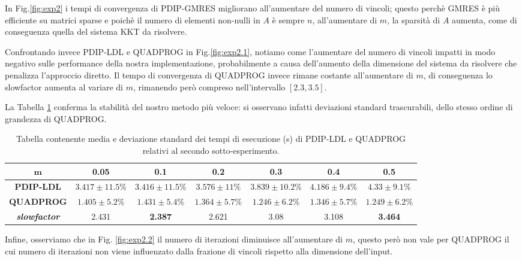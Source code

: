 In Fig.\ref{fig:exp2} i tempi di convergenza di PDIP-GMRES migliorano all'aumentare del numero di vincoli; questo perchè GMRES è più efficiente su matrici sparse e poichè il numero di elementi non-nulli in $A$ è sempre $n$, all'aumentare di $m$, la sparsità di $A$ aumenta, come di conseguenza quella del sistema KKT da risolvere.

Confrontando invece PDIP-LDL e QUADPROG in Fig.\ref{fig:exp2.1}, notiamo come l'aumentare del numero di vincoli impatti in modo negativo sulle performance della nostra implementazione, probabilmente a causa dell'aumento della dimensione del sistema da risolvere che penalizza l'approccio diretto. Il tempo di convergenza di QUADPROG invece rimane costante all'aumentare di $m$, di conseguenza lo slowfactor aumenta al variare di $m$, rimanendo però compreso nell'intervallo $[2.3, 3.5]$.

La Tabella \ref{tab:ldlqp2} conferma la stabilità del nostro metodo più veloce: si osservano infatti deviazioni standard trascurabili, dello stesso ordine di grandezza di QUADPROG.

\begin{table}[!h]
\centering
\begin{tabular}{c|c|c|c|c|c|c}

$\mathbf{m}$            & \textbf{0.05} & \textbf{0.1} & \textbf{0.2} & \textbf{0.3} & \textbf{0.4} & \textbf{0.5} \\ \hline
\textbf{PDIP-LDL}                    & $3.417 \pm 11.5\%$       & $3.416 \pm 11.5\%$       & $3.576     \pm 11\%$   & $3.839 \pm 10.2\%$      & $4.186 \pm 9.4\%$      & $4.33 \pm 9.1\%$       \\
\textbf{QUADPROG}                    & $1.405 \pm 5.2\%$       & $1.431 \pm 5.4\%$       & $1.364 \pm 5.7\%$       & $1.246 \pm 6.2\%$       & $1.346 \pm 5.7\%$       & $1.249 \pm 6.2\%$       \\
\textbf{\textit{slowfactor}} &2.431        & \textbf{2.387}      & 2.621       & 3.08       & 3.108       & \textbf{3.464} 
\end{tabular}
\caption{Tabella contenente media e deviazione standard dei tempi di esecuzione (s) di PDIP-LDL e QUADPROG relativi al secondo sotto-esperimento.\label{tab:ldlqp2}}
\end{table}

Infine, osserviamo che in Fig. \ref{fig:exp2.2} il numero di iterazioni diminuisce all'aumentare di $m$, questo però non vale per QUADPROG il cui numero di iterazioni non viene influenzato dalla frazione di vincoli rispetto alla dimensione dell'input.


